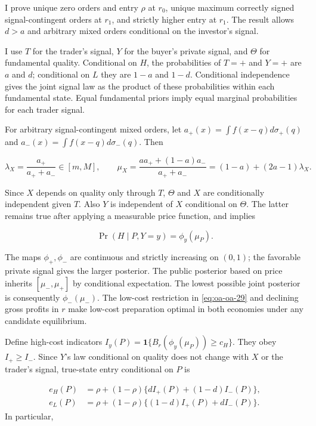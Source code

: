\documentclass[
  11pt,
]{article}
\begin{document}
I prove unique zero orders and entry \(\rho\) at \(r_0\), unique maximum
correctly signed signal-contingent orders at \(r_1\), and strictly
higher entry at \(r_1\). The result allows \(d>a\) and arbitrary mixed
orders conditional on the investor's signal.

I use \(T\) for the trader's signal, \(Y\) for the buyer's private
signal, and \(\Theta\) for fundamental quality. Conditional on \(H\),
the probabilities of \(T=+\) and \(Y=+\) are \(a\) and \(d\);
conditional on \(L\) they are \(1-a\) and \(1-d\). Conditional
independence gives the joint signal law as the product of these
probabilities within each fundamental state. Equal fundamental priors
imply equal marginal probabilities for each trader signal.

For arbitrary signal-contingent mixed orders, let
\(a_+(x)=\int f(x-q)d\sigma_+(q)\) and
\(a_-(x)=\int f(x-q)d\sigma_-(q)\). Then

\[
\lambda_X=\frac{a_+}{a_++a_-}\in[m,M],\qquad
\mu_X=\frac{a a_++(1-a)a_-}{a_++a_-}=(1-a)+(2a-1)\lambda_X.
\tag{OA.30}\label{eq:oa-oa-30}
\]

Since \(X\) depends on quality only through \(T\), \(\Theta\) and \(X\)
are conditionally independent given \(T\). Also \(Y\) is independent of
\(X\) conditional on \(\Theta\). The latter remains true after applying
a measurable price function, and implies

\[
\Pr(H\mid P,Y=y)=\phi_y(\mu_P).
\tag{OA.31}\label{eq:oa-oa-31}
\]

The maps \(\phi_+,\phi_-\) are continuous and strictly increasing on
\((0,1)\); the favorable private signal gives the larger posterior. The
public posterior based on price inherits \([\mu_-,\mu_+]\) by
conditional expectation. The lowest possible joint posterior is
consequently \(\phi_-(\mu_-)\). The low-cost restriction in
\eqref{eq:oa-oa-29} and declining gross profits in \(r\) make low-cost
preparation optimal in both economies under any candidate equilibrium.

Define high-cost indicators
\(I_y(P)=\mathbf1\{B_r(\phi_y(\mu_P))\ge c_H\}\). They obey
\(I_+\ge I_-\). Since \(Y\)'s law conditional on quality does not change
with \(X\) or the trader's signal, true-state entry conditional on \(P\)
is

\[
\begin{aligned}
e_H(P)&=\rho+(1-\rho)\{d I_+(P)+(1-d)I_-(P)\},\\
e_L(P)&=\rho+(1-\rho)\{(1-d)I_+(P)+dI_-(P)\}.
\end{aligned}
\tag{OA.32}\label{eq:oa-oa-32}
\] In particular,
\end{document}
